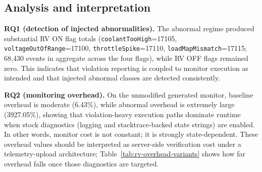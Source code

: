 \begin{table}[ht]
    \centering
    \caption{Runtime verification overhead summary (unmodified generated monitor; 5 measured runs per mode)}
    \label{tab:rv-overhead}
    \scriptsize
\end{table}

\subsection{Analysis and interpretation}

\textbf{RQ1 (detection of injected abnormalities).} The abnormal regime produced substantial RV ON flag totals (\texttt{coolantTooHigh}=17105, \texttt{voltageOutOfRange}=17100, \texttt{throttleSpike}=17110, \texttt{loadMapMismatch}=17115; 68{,}430 events in aggregate across the four flags), while RV OFF flags remained zero. This indicates that violation reporting is coupled to monitor execution as intended and that injected abnormal classes are detected consistently.

\textbf{RQ2 (monitoring overhead).} On the unmodified generated monitor, baseline overhead is moderate (6.43\%), while abnormal overhead is extremely large (3927.05\%), showing that violation-heavy execution paths dominate runtime when stock diagnostics (logging and stacktrace-backed state strings) are enabled. In other words, monitor cost is not constant; it is strongly state-dependent. These overhead values should be interpreted as server-side verification cost under a telemetry-upload architecture; Table~\ref{tab:rv-overhead-variants} shows how far overhead falls once those diagnostics are targeted.

